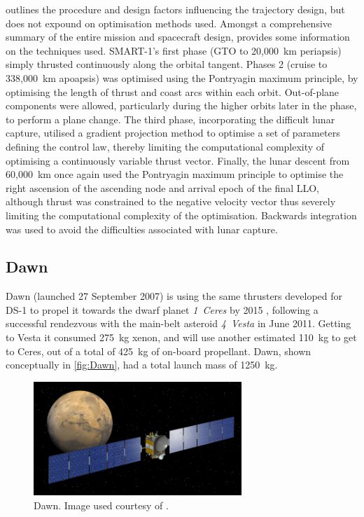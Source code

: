 \textcite{Schoenmaekers2004} outlines the procedure and design factors influencing the trajectory design, but does not expound on optimisation methods used. Amongst a comprehensive summary of the entire mission and spacecraft design, \textcite{Racca2002} provides some information on the techniques used. SMART-1's first phase (GTO to 20,000~km periapsis) simply thrusted continuously along the orbital tangent. Phases 2 (cruise to 338,000~km apoapsis) was optimised using the Pontryagin maximum principle, by optimising the length of thrust and coast arcs within each orbit. Out-of-plane components were allowed, particularly during the higher orbits later in the phase, to perform a plane change. The third phase, incorporating the difficult lunar capture, utilised a gradient projection method to optimise a set of parameters defining the control law, thereby limiting the computational complexity of optimising a continuously variable thrust vector. Finally, the lunar descent from 60,000~km once again used the Pontryagin maximum principle to optimise the right ascension of the ascending node and arrival epoch of the final LLO, although thrust was constrained to the negative velocity vector thus severely limiting the computational complexity of the optimisation. Backwards integration was used to avoid the difficulties associated with lunar capture. 

\subsection{Dawn}
Dawn (launched 27 September 2007) is using the same thrusters developed for DS-1 to propel it towards the dwarf planet \emph{1~Ceres} by 2015 \parencite{web_Dawn}, following a successful rendezvous with the main-belt asteroid \emph{4~Vesta} in June 2011. Getting to Vesta it consumed 275~kg xenon, and will use another estimated 110~kg to get to Ceres, out of a total of 425~kg of on-board propellant. Dawn, shown conceptually in \autoref{fig:Dawn}, had a total launch mass of 1250~kg.

\begin{figure}[ht]
\centering
\includegraphics  [width=0.7\textwidth] {Images/mars-browse.jpg}
\caption{Dawn. Image used courtesy of \textcite{web_Dawn}.}
\label{fig:Dawn}
\end{figure}

